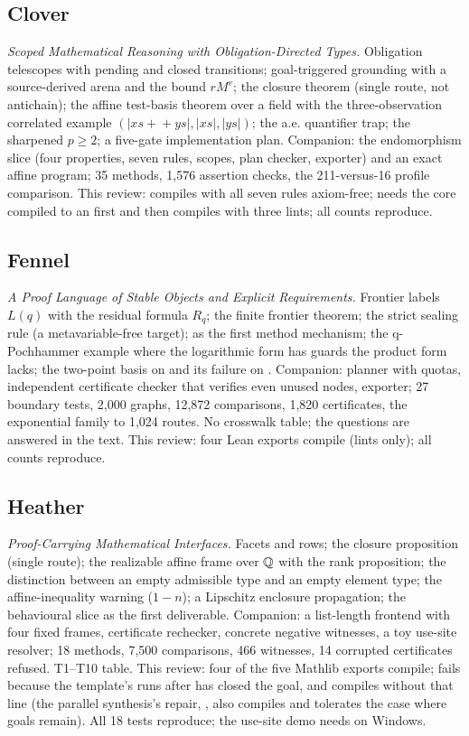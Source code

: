 \subsection*{Clover}
\emph{Scoped Mathematical Reasoning with Obligation-Directed Types.} Obligation telescopes with pending and closed transitions; goal-triggered grounding with a source-derived arena and the bound $rM^v$; the closure theorem (single route, not antichain); the affine test-basis theorem over a field with the three-observation correlated example $(|xs+\!\!+ys|,|xs|,|ys|)$; the a.e. quantifier trap; the sharpened $p\ge2$; a five-gate implementation plan. Companion: the endomorphism slice (four properties, seven rules, scopes, plan checker, exporter) and an exact affine program; 35 methods, 1,576 assertion checks, the 211-versus-16 profile comparison. This review:  compiles with all seven rules axiom-free;  needs the core compiled to an  first and then compiles with three lints; all counts reproduce.

\subsection*{Fennel}
\emph{A Proof Language of Stable Objects and Explicit Requirements.} Frontier labels $L(q)$ with the residual formula $R_q$; the finite frontier theorem; the strict sealing rule (a metavariable-free target);  as the first method mechanism; the q-Pochhammer example where the logarithmic form has guards the product form lacks; the two-point basis on  and its failure on . Companion: planner with quotas, independent certificate checker that verifies even unused nodes, exporter; 27 boundary tests, 2,000 graphs, 12,872 comparisons, 1,820 certificates, the exponential family to 1,024 routes. No crosswalk table; the questions are answered in the text. This review: four Lean exports compile (lints only); all counts reproduce.

\subsection*{Heather}
\emph{Proof-Carrying Mathematical Interfaces.} Facets and rows; the closure proposition (single route); the realizable affine frame over $\mathbb Q$ with the rank proposition; the distinction between an empty admissible type and an empty element type; the affine-inequality warning ($1-n$); a Lipschitz enclosure propagation; the behavioural slice as the first deliverable. Companion: a list-length frontend with four fixed frames, certificate rechecker, concrete negative witnesses, a toy use-site resolver; 18 methods, 7,500 comparisons, 466 witnesses, 14 corrupted certificates refused. T1--T10 table. This review: four of the five Mathlib exports compile;  fails because the template's  runs after  has closed the goal, and compiles without that line (the parallel synthesis's repair, , also compiles and tolerates the case where goals remain). All 18 tests reproduce; the use-site demo needs  on Windows.

